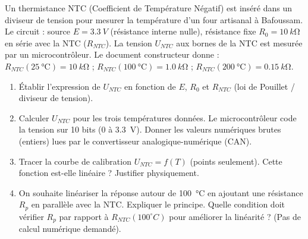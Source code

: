 \documentclass[11pt]{article}
\begin{document}
\begin{exercice}
Un thermistance NTC (Coefficient de Température Négatif) est inséré dans un diviseur de tension pour mesurer la température d'un four artisanal à Bafoussam. Le circuit : source $E = \SI{3,3}{V}$ (résistance interne nulle), résistance fixe $R_0 = \SI{10}{k\ohm}$ en série avec la NTC ($R_{NTC}$). La tension $U_{NTC}$ aux bornes de la NTC est mesurée par un microcontrôleur.
Le document constructeur donne : $R_{NTC}(\SI{25}{\celsius}) = \SI{10}{k\ohm}$ ; $R_{NTC}(\SI{100}{\celsius}) = \SI{1,0}{k\ohm}$ ; $R_{NTC}(\SI{200}{\celsius}) = \SI{0,15}{k\ohm}$.
\begin{enumerate}
\item Établir l'expression de $U_{NTC}$ en fonction de $E$, $R_0$ et $R_{NTC}$ (loi de Pouillet / diviseur de tension).
\item Calculer $U_{NTC}$ pour les trois températures données. Le microcontrôleur code la tension sur 10 bits (0 à \SI{3,3}{V}). Donner les valeurs numériques brutes (entiers) lues par le convertisseur analogique-numérique (CAN).
\item Tracer la courbe de calibration $U_{NTC} = f(T)$ (points seulement). Cette fonction est-elle linéaire ? Justifier physiquement.
\item On souhaite linéariser la réponse autour de \SI{100}{\celsius} en ajoutant une résistance $R_p$ en parallèle avec la NTC. Expliquer le principe. Quelle condition doit vérifier $R_p$ par rapport à $R_{NTC}(100^{\circ}C)$ pour améliorer la linéarité ? (Pas de calcul numérique demandé).
\end{enumerate}
\end{exercice}
\end{document}
